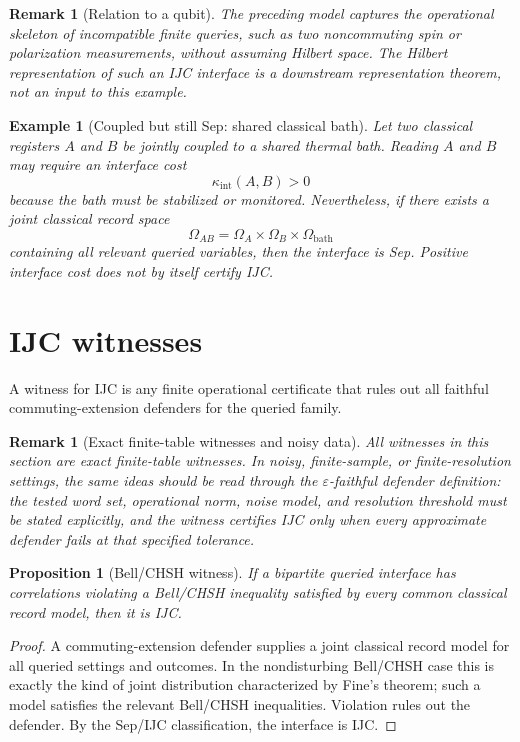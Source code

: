 \documentclass[11pt]{article}
\newtheorem{proposition}[theorem]{Proposition}
\newtheorem{example}[theorem]{Example}
\newtheorem{remark}[theorem]{Remark}
\begin{document}
\begin{remark}[Relation to a qubit]
The preceding model captures the operational skeleton of incompatible finite queries, such as two noncommuting spin or polarization measurements, without assuming Hilbert space.  The Hilbert representation of such an IJC interface is a downstream representation theorem, not an input to this example.
\end{remark}

\begin{example}[Coupled but still Sep: shared classical bath]
Let two classical registers $A$ and $B$ be jointly coupled to a shared thermal bath.  Reading $A$ and $B$ may require an interface cost
\[
 \kappa_{\mathrm{int}}(A,B)>0
\]
because the bath must be stabilized or monitored.  Nevertheless, if there exists a joint classical record space
\[
 \Omega_{AB}=\Omega_A\times\Omega_B\times\Omega_{\mathrm{bath}}
\]
containing all relevant queried variables, then the interface is Sep.  Positive interface cost does not by itself certify IJC.
\end{example}

\section{IJC witnesses}\label{sec:ijc-witnesses}

A witness for IJC is any finite operational certificate that rules out all faithful commuting-extension defenders for the queried family.

\begin{remark}[Exact finite-table witnesses and noisy data]\label{rem:exact-noisy-witnesses}
All witnesses in this section are exact finite-table witnesses.  In noisy, finite-sample, or finite-resolution settings, the same ideas should be read through the $\varepsilon$-faithful defender definition: the tested word set, operational norm, noise model, and resolution threshold must be stated explicitly, and the witness certifies IJC only when every approximate defender fails at that specified tolerance.
\end{remark}


\begin{proposition}[Bell/CHSH witness]
If a bipartite queried interface has correlations violating a Bell/CHSH inequality satisfied by every common classical record model, then it is IJC.
\end{proposition}
\begin{proof}
A commuting-extension defender supplies a joint classical record model for all queried settings and outcomes.  In the nondisturbing Bell/CHSH case this is exactly the kind of joint distribution characterized by Fine's theorem; such a model satisfies the relevant Bell/CHSH inequalities.  Violation rules out the defender.  By the Sep/IJC classification, the interface is IJC.
\end{proof}
\end{document}
